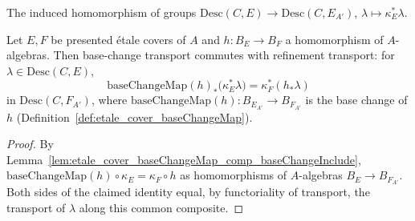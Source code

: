 \begin{definition}
  \label{def:descentBaseChange}
  \leanok
  The induced homomorphism of groups \(\mathrm{Desc}(C,E) \to \mathrm{Desc}(C,E_{A'})\),
  \(\lambda \mapsto \kappa_E^{*}\lambda\).
\end{definition}

\begin{lemma}
  \label{lem:descentMap_baseChangeMap}
  \leanok
  Let \(E, F\) be presented \'etale covers of \(A\) and \(h \colon B_E \to B_F\) a
  homomorphism of \(A\)-algebras. Then base-change transport commutes with refinement
  transport: for \(\lambda \in \mathrm{Desc}(C,E)\),
  \[
    \mathrm{baseChangeMap}(h)_{*}\bigl(\kappa_{E}^{*}\lambda\bigr) = \kappa_{F}^{*}(h_{*}\lambda)
  \]
  in \(\mathrm{Desc}(C,F_{A'})\), where \(\mathrm{baseChangeMap}(h) \colon B_{E_{A'}} \to
  B_{F_{A'}}\) is the base change of \(h\) (Definition~\ref{def:etale_cover_baseChangeMap}).
\end{lemma}
\begin{proof}
  \leanok
  By Lemma~\ref{lem:etale_cover_baseChangeMap_comp_baseChangeInclude},
  \(\mathrm{baseChangeMap}(h) \circ \kappa_E = \kappa_F \circ h\) as homomorphisms of
  \(A\)-algebras \(B_E \to B_{F_{A'}}\). Both sides of the claimed identity equal, by
  functoriality of transport, the transport of \(\lambda\) along this common composite.
\end{proof}

